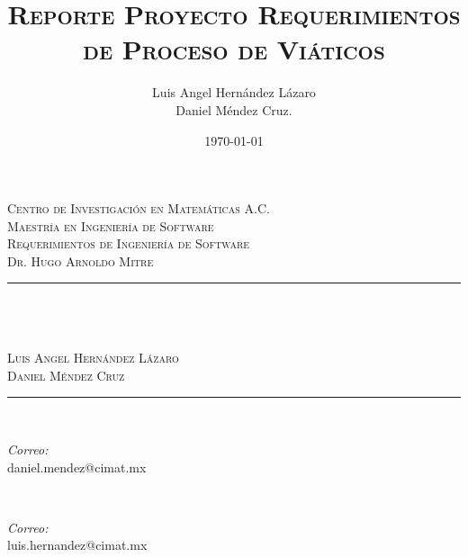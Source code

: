 \documentclass{report}
\title{\textsc{Reporte Proyecto Requerimientos de Proceso de Viáticos}}
\author{Luis Angel Hernández Lázaro\\  Daniel Méndez Cruz. }
\date{\today}
\makeatletter
\let\thetitle\@title
\makeatother
\begin{document}

\begin{titlepage}
	\centering
    \vspace*{0.5 cm}
    
    
    \begin{figure}
		\centering
	\end{figure}
    \textsc{\LARGE Centro de Investigación en Matemáticas A.C.}\\[1.0 cm]
	\textsc{\Large Maestría en Ingeniería de Software}\\[0.5 cm]
	\textsc{\large Requerimientos de Ingeniería de Software\\Dr. Hugo Arnoldo Mitre}\\[0.5 cm]
	\rule{\linewidth}{0.2 mm} \\[0.4 cm]
	{ \huge \bfseries \thetitle}\\ \textsc{\large \\ Luis Angel Hernández Lázaro \\ Daniel Méndez Cruz}
	\rule{\linewidth}{0.2 mm} \\[1.5 cm]
	
	\begin{minipage}{0.5\textwidth}
		\begin{flushleft} \large
			\emph{Correo:}\\
			daniel.mendez@cimat.mx
		\end{flushleft}
	\end{minipage}~
	\begin{minipage}{0.4\textwidth}
		\begin{flushright} \large
			\emph{Correo:} \\
			luis.hernandez@cimat.mx
		\end{flushright}
	\end{minipage}\\[2 cm]
		

\end{titlepage}
\end{document}
